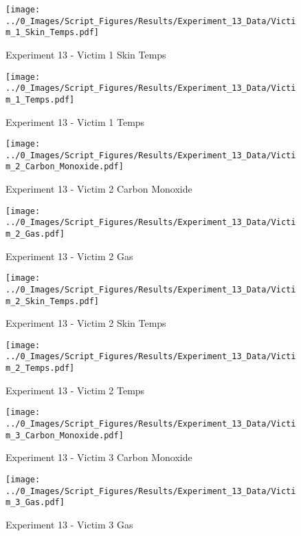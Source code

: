 	\begin{figure}[H]
		\centering
		\texttt{[image: ../0\_Images/Script\_Figures/Results/Experiment\_13\_Data/Victim\_1\_Skin\_Temps.pdf]}
		\caption[]{Experiment 13 - Victim 1 Skin Temps}
	\end{figure}
 
	\clearpage

	\begin{figure}[H]
		\centering
		\texttt{[image: ../0\_Images/Script\_Figures/Results/Experiment\_13\_Data/Victim\_1\_Temps.pdf]}
		\caption[]{Experiment 13 - Victim 1 Temps}
	\end{figure}
 

	\begin{figure}[H]
		\centering
		\texttt{[image: ../0\_Images/Script\_Figures/Results/Experiment\_13\_Data/Victim\_2\_Carbon\_Monoxide.pdf]}
		\caption[]{Experiment 13 - Victim 2 Carbon Monoxide}
	\end{figure}
 
	\clearpage

	\begin{figure}[H]
		\centering
		\texttt{[image: ../0\_Images/Script\_Figures/Results/Experiment\_13\_Data/Victim\_2\_Gas.pdf]}
		\caption[]{Experiment 13 - Victim 2 Gas}
	\end{figure}
 

	\begin{figure}[H]
		\centering
		\texttt{[image: ../0\_Images/Script\_Figures/Results/Experiment\_13\_Data/Victim\_2\_Skin\_Temps.pdf]}
		\caption[]{Experiment 13 - Victim 2 Skin Temps}
	\end{figure}
 
	\clearpage

	\begin{figure}[H]
		\centering
		\texttt{[image: ../0\_Images/Script\_Figures/Results/Experiment\_13\_Data/Victim\_2\_Temps.pdf]}
		\caption[]{Experiment 13 - Victim 2 Temps}
	\end{figure}
 

	\begin{figure}[H]
		\centering
		\texttt{[image: ../0\_Images/Script\_Figures/Results/Experiment\_13\_Data/Victim\_3\_Carbon\_Monoxide.pdf]}
		\caption[]{Experiment 13 - Victim 3 Carbon Monoxide}
	\end{figure}
 
	\clearpage

	\begin{figure}[H]
		\centering
		\texttt{[image: ../0\_Images/Script\_Figures/Results/Experiment\_13\_Data/Victim\_3\_Gas.pdf]}
		\caption[]{Experiment 13 - Victim 3 Gas}
	\end{figure}
 

